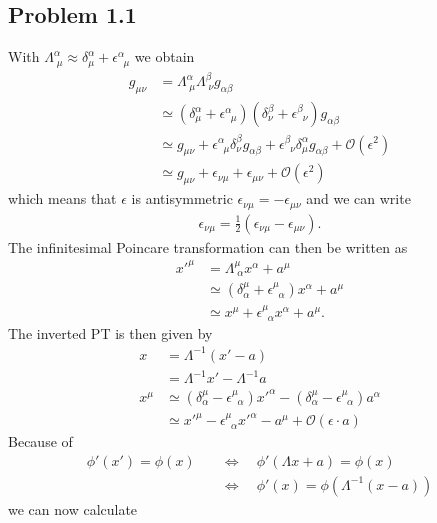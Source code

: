 \documentclass[../main.tex]{subfiles}
\begin{document}
\subsection{Problem 1.1}
With $\Lambda^\alpha_{\;\mu}\approx\delta^\alpha_\mu+\epsilon^\alpha_{\;\;\mu}$ we obtain
\begin{align}
g_{\mu\nu}
&=\Lambda^\alpha_{\;\mu}\Lambda^\beta_{\;\nu}g_{\alpha\beta}\\
&\simeq\left(\delta^\alpha_\mu+\epsilon^\alpha_{\;\;\mu}\right)\left(\delta^\beta_\nu+\epsilon^\beta_{\;\;\nu}\right)g_{\alpha\beta}\\
&\simeq g_{\mu\nu}+\epsilon^\alpha_{\;\;\mu}\delta^\beta_\nu g_{\alpha\beta}+\epsilon^\beta_{\;\;\nu}\delta^\alpha_\mu g_{\alpha\beta}+\mathcal{O}(\epsilon^2)\\
&\simeq g_{\mu\nu}+\epsilon_{\nu\mu}+\epsilon_{\mu\nu}+\mathcal{O}(\epsilon^2)
\end{align}
which means that $\epsilon$ is antisymmetric $\epsilon_{\nu\mu}=-\epsilon_{\mu\nu}$ and we can write
\begin{align}
\epsilon_{\nu\mu}=\frac{1}{2}\left(\epsilon_{\nu\mu}-\epsilon_{\mu\nu}\right).
\end{align}
The infinitesimal Poincare transformation can then be written as
\begin{align}
x'^\mu
&=\Lambda^\mu_{\;\alpha}x^\alpha+a^\mu\\
&\simeq\left(\delta^\mu_\alpha+\epsilon^\mu_{\;\;\alpha}\right)x^\alpha+a^\mu\\
&\simeq x^\mu+\epsilon^\mu_{\;\;\alpha}x^\alpha+a^\mu.
\end{align}
The inverted PT is then given by
\begin{align}
x&=\Lambda^{-1}(x'-a)\\
&=\Lambda^{-1}x'-\Lambda^{-1}a\\
x^\mu&\simeq\left(\delta^\mu_\alpha-\epsilon^\mu_{\;\;\alpha}\right)x'^\alpha-\left(\delta^\mu_\alpha-\epsilon^\mu_{\;\;\alpha}\right)a^\alpha\\
&\simeq x'^\mu-\epsilon^\mu_{\;\;\alpha}x'^\alpha-a^\mu+\mathcal{O}(\epsilon\cdot a)
\end{align}
Because of 
\begin{align}
\phi'(x')=\phi(x)
&\quad\Leftrightarrow\quad\phi'(\Lambda x+a)=\phi(x)\\
&\quad\Leftrightarrow\quad\phi'(x)=\phi(\Lambda^{-1}(x-a))
\end{align}
we can now calculate 
\end{document}
